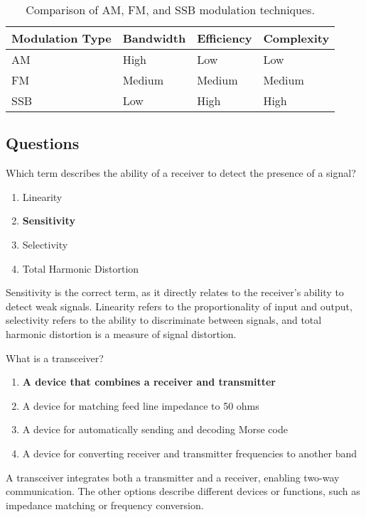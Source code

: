 \begin{table}[h!]
    \centering
    \begin{tabular}{|l|l|l|l|}
        \hline
        \textbf{Modulation Type} & \textbf{Bandwidth} & \textbf{Efficiency} & \textbf{Complexity} \\
        \hline
        AM & High & Low & Low \\
        FM & Medium & Medium & Medium \\
        SSB & Low & High & High \\
        \hline
    \end{tabular}
    \caption{Comparison of AM, FM, and SSB modulation techniques.}
    \label{tab:modulation_comparison}
\end{table}

\subsection*{Questions}
\begin{tcolorbox}[colback=gray!10!white,colframe=black!75!black,title={T7A01}]
    Which term describes the ability of a receiver to detect the presence of a signal?
    \begin{enumerate}[label=\Alph*),noitemsep]
        \item Linearity
        \item \textbf{Sensitivity}
        \item Selectivity
        \item Total Harmonic Distortion
    \end{enumerate}
\end{tcolorbox}
Sensitivity is the correct term, as it directly relates to the receiver's ability to detect weak signals. Linearity refers to the proportionality of input and output, selectivity refers to the ability to discriminate between signals, and total harmonic distortion is a measure of signal distortion.


\begin{tcolorbox}[colback=gray!10!white,colframe=black!75!black,title={T7A02}]
    What is a transceiver?
    \begin{enumerate}[label=\Alph*),noitemsep]
        \item \textbf{A device that combines a receiver and transmitter}
        \item A device for matching feed line impedance to 50 ohms
        \item A device for automatically sending and decoding Morse code
        \item A device for converting receiver and transmitter frequencies to another band
    \end{enumerate}
\end{tcolorbox}
A transceiver integrates both a transmitter and a receiver, enabling two-way communication. The other options describe different devices or functions, such as impedance matching or frequency conversion.

